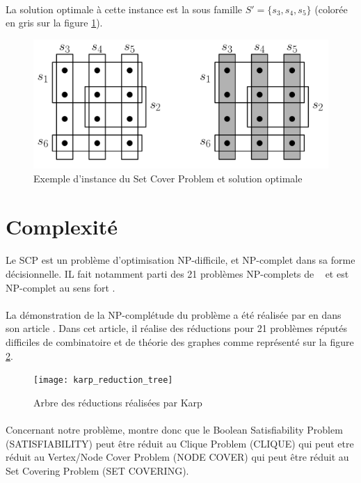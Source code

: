 \documentclass[12pt,letterpaper,twoside]{article}
\begin{document}
		\paragraph*{}
			La solution optimale à cette instance est la sous famille \(S'=\{s_3, s_4, s_5\}\) (colorée en gris sur la figure \ref{fig:example}).
		\begin{figure}[H]
			\centering%
			\includegraphics[width=0.65\linewidth]{figures/example}%
			\caption{Exemple d'instance du Set Cover Problem et solution optimale\cite{Mount2017}}%
			\label{fig:example}%
		\end{figure}
	\section{Complexité}
		\paragraph*{}
			Le SCP est un problème d'optimisation NP-difficile, et NP-complet dans sa forme décisionnelle. IL fait notamment parti des 21 problèmes NP-complets de \citeauthor{Karp1972}~\cite{Karp1972} et est NP-complet au sens fort \cite{garey2002computers}.
		\paragraph*{}
			La démonstration de la NP-complétude du problème a été réalisée par \citeauthor{Karp1972} en \citeyear{Karp1972} dans son article \cite{Karp1972}. Dans cet article, il réalise des réductions pour 21 problèmes réputés difficiles de combinatoire et de théorie des graphes comme représenté sur la figure \ref{fig:karp_reduction_tree}.
		\begin{figure}[H]
			\centering%
			\texttt{[image: karp\_reduction\_tree]}%
			\caption{Arbre des réductions réalisées par Karp\cite{Karp1972}}%
			\label{fig:karp_reduction_tree}%
		\end{figure}
		\paragraph*{}
			Concernant notre problème, \citeauthor{Karp1972} montre donc que le Boolean Satisfiability Problem (SATISFIABILITY) peut être réduit au Clique Problem (CLIQUE) qui peut etre réduit au Vertex/Node Cover Problem (NODE COVER) qui peut être réduit au Set Covering Problem (SET COVERING).
\end{document}
